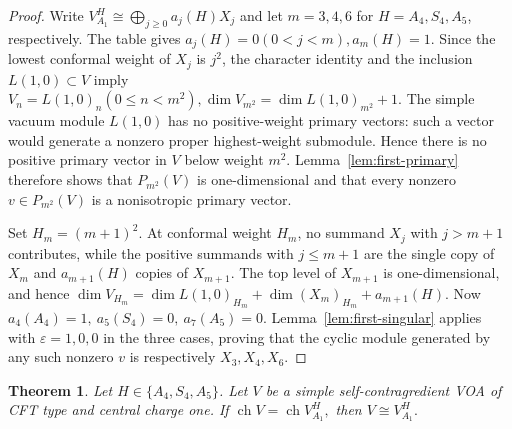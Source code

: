 \documentclass[10pt,a4paper]{amsart}
\numberwithin{equation}{section} \newtheorem{thm}{Theorem}[section] \newtheorem{lem}[thm]{Lemma} \newtheorem{ex}[thm]{Example} \newtheorem{prop}[thm]{Proposition} \newtheorem{cor}[thm]{Corollary} \newtheorem{defi}[thm]{Definition} \newtheorem{rmk}[thm]{Remark} \newtheorem{notation}[thm]{Notation}
\newcommand{\ch}{\operatorname{ch}}
\begin{document}
\begin{proof}
Write \(V_{A_1}^H\cong\bigoplus_{j\ge0}a_j(H)X_j\) and let $m=3,4,6$ for $H=A_4,S_4,A_5$, respectively. The table gives \(a_j(H)=0(0<j<m),a_m(H)=1.\) Since the lowest conformal weight of $X_j$ is $j^2$, the character identity and the inclusion $L(1,0)\subset V$ imply \(V_n=L(1,0)_n(0\le n<m^2),\dim V_{m^2}=\dim L(1,0)_{m^2}+1.\) The simple vacuum module $L(1,0)$ has no positive-weight primary vectors: such a vector would generate a nonzero proper highest-weight submodule. Hence there is no positive primary vector in $V$ below weight $m^2$. Lemma~\ref{lem:first-primary} therefore shows that \(P_{m^2}(V)\) is one-dimensional and that every nonzero \(v\in P_{m^2}(V)\) is a nonisotropic primary vector.

Set $H_m=(m+1)^2$. At conformal weight $H_m$, no summand $X_j$ with $j>m+1$ contributes, while the positive summands with $j\le m+1$ are the single copy of $X_m$ and $a_{m+1}(H)$ copies of $X_{m+1}$. The top level of $X_{m+1}$ is one-dimensional, and hence \(\dim V_{H_m}=\dim L(1,0)_{H_m}+\dim(X_m)_{H_m}+a_{m+1}(H).\) Now \(a_4(A_4)=1,\ a_5(S_4)=0,\ a_7(A_5)=0\). Lemma~\ref{lem:first-singular} applies with $\varepsilon=1,0,0$ in the three cases, proving that the cyclic module generated by any such nonzero $v$ is respectively $X_3,X_4,X_6$.
\end{proof}

\begin{thm}\label{thm:exceptional-rigidity}
Let $H\in\{A_4,S_4,A_5\}$. Let $V$ be a simple self-contragredient VOA of CFT type and central charge one. If \(\ch V=\ch V_{A_1}^{H},\) then \(V\cong V_{A_1}^{H}.\)
\end{thm}
\end{document}
